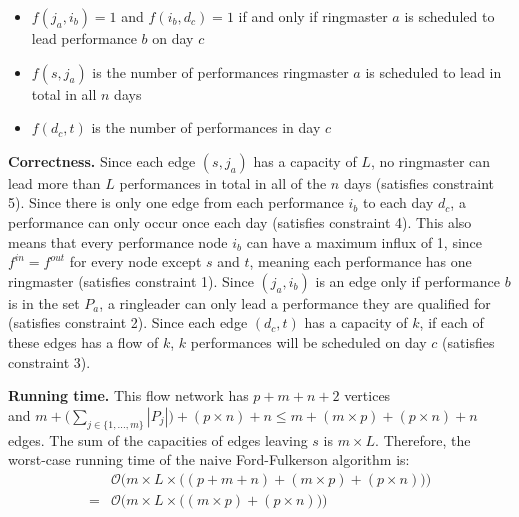 \documentclass{article}
\newcommand{\bigO}{\mathcal{O}}
\begin{document}
\begin{enumerate}
\begin{enumerate}
\begin{itemize}
            \item $f(j_a, i_b) = 1$ and $f(i_b, d_c) = 1$ if and only if ringmaster $a$ is scheduled to lead performance $b$ on day $c$
            \item $f(s, j_a)$ is the number of performances ringmaster $a$ is scheduled to lead in total in all $n$ days
            \item $f(d_c, t)$ is the number of performances in day $c$
        \end{itemize}
        \textbf{Correctness.} Since each edge $(s, j_a)$ has a capacity of $L$, no ringmaster can lead more than $L$ performances in total in all of the $n$ days (satisfies constraint 5). Since there is only one edge from each performance $i_b$ to each day $d_c$, a performance can only occur once each day (satisfies constraint 4). This also means that every performance node $i_b$ can have a maximum influx of 1, since $f^{in} = f^{out}$ for every node except $s$ and $t$, meaning each performance has one ringmaster (satisfies constraint 1). Since $(j_a, i_b)$ is an edge only if performance $b$ is in the set $P_a$, a ringleader can only lead a performance they are qualified for (satisfies constraint 2). Since each edge $(d_c, t)$ has a capacity of $k$, if each of these edges has a flow of $k$, $k$ performances will be scheduled on day $c$ (satisfies constraint 3).
        
        \textbf{Running time.} This flow network has $p + m + n + 2$ vertices \\
        and $m + \big(\sum_{j \in \{1, ..., m\}} |P_j|\big) + (p \times n) + n \leq m + (m \times p) + (p \times n) + n$ edges. The sum of the capacities of edges leaving $s$ is $m \times L$. Therefore, the worst-case running time of the naive Ford-Fulkerson algorithm is:
        \begin{align*}
            &\bigO\bigg(m \times L \times \big((p + m + n) + (m \times p) + (p \times n)\big)\bigg) \\
            = &\bigO\bigg(m \times L \times \big((m \times p) + (p \times n)\big)\bigg)
        \end{align*}
    \end{enumerate}
    
    
    

\end{enumerate}
\end{document}
